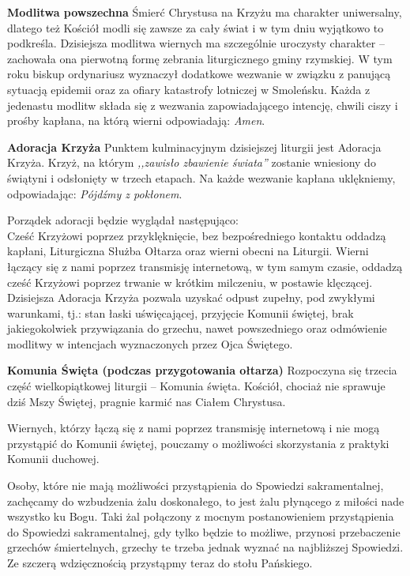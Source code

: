 \documentclass[10pt,oneside,final,notitlepage,a4paper,wide]{mwart}
\begin{document}
	\textbf{Modlitwa powszechna} Śmierć Chrystusa na Krzyżu ma charakter uniwersalny, dlatego też Kościół modli się zawsze za cały świat i w tym dniu wyjątkowo to podkreśla. Dzisiejsza modlitwa wiernych ma szczególnie uroczysty charakter -- zachowała ona pierwotną formę zebrania liturgicznego gminy rzymskiej. W tym roku biskup ordynariusz wyznaczył dodatkowe wezwanie w związku z panującą sytuacją epidemii oraz za ofiary katastrofy lotniczej w Smoleńsku. Każda z jedenastu modlitw składa się z wezwania zapowiadającego intencję, chwili ciszy i prośby kapłana, na którą wierni odpowiadają: \emph{Amen}.\bigskip
	
	\textbf{Adoracja Krzyża} Punktem kulminacyjnym dzisiejszej liturgii jest Adoracja Krzyża. Krzyż, na którym \emph{,,zawisło zbawienie świata''} zostanie wniesiony do świątyni i odsłonięty w trzech etapach. Na każde wezwanie kapłana uklękniemy, odpowiadając: \emph{Pójdźmy z pokłonem}.
\par Porządek adoracji będzie wyglądał następująco:\\
Cześć Krzyżowi poprzez przyklęknięcie, bez bezpośredniego kontaktu oddadzą kapłani, Liturgiczna Służba Ołtarza oraz wierni obecni na Liturgii. Wierni łączący się z nami poprzez transmisję internetową, w tym samym czasie, oddadzą cześć Krzyżowi poprzez trwanie w krótkim milczeniu, w postawie klęczącej. Dzisiejsza Adoracja Krzyża pozwala uzyskać odpust zupełny, pod zwykłymi warunkami, tj.: stan łaski uświęcającej, przyjęcie Komunii świętej, brak jakiegokolwiek przywiązania do grzechu, nawet powszedniego oraz odmówienie modlitwy w intencjach wyznaczonych przez Ojca Świętego. \newpage %
	
	\textbf{Komunia Święta (podczas przygotowania ołtarza)} Rozpoczyna się trzecia część wielkopiątkowej liturgii -- Komunia święta. Kościół, chociaż nie sprawuje dziś Mszy Świętej, pragnie karmić nas Ciałem Chrystusa.
	\par Wiernych, którzy łączą się z nami poprzez transmisję internetową i nie mogą przystąpić do Komunii świętej, pouczamy o możliwości skorzystania z praktyki Komunii duchowej.
	\par Osoby, które nie mają możliwości przystąpienia do Spowiedzi sakramentalnej, zachęcamy do wzbudzenia żalu doskonałego, to jest żalu płynącego z miłości nade wszystko ku Bogu. Taki żal połączony z mocnym postanowieniem przystąpienia do Spowiedzi sakramentalnej, gdy tylko będzie to możliwe, przynosi przebaczenie grzechów śmiertelnych, grzechy te trzeba jednak wyznać na najbliższej Spowiedzi.
Ze szczerą wdzięcznością przystąpmy teraz do stołu Pańskiego. \bigskip
\end{document}
